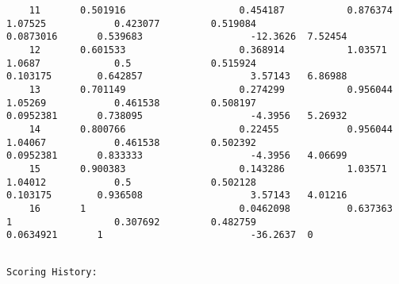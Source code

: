 \documentclass[11pt]{article}
\begin{document}
\begin{verbatim}
    11       0.501916                    0.454187           0.876374  1.07525            0.423077         0.519084                    0.0873016       0.539683                   -12.3626  7.52454
    12       0.601533                    0.368914           1.03571   1.0687             0.5              0.515924                    0.103175        0.642857                   3.57143   6.86988
    13       0.701149                    0.274299           0.956044  1.05269            0.461538         0.508197                    0.0952381       0.738095                   -4.3956   5.26932
    14       0.800766                    0.22455            0.956044  1.04067            0.461538         0.502392                    0.0952381       0.833333                   -4.3956   4.06699
    15       0.900383                    0.143286           1.03571   1.04012            0.5              0.502128                    0.103175        0.936508                   3.57143   4.01216
    16       1                           0.0462098          0.637363  1                  0.307692         0.482759                    0.0634921       1                          -36.2637  0
    \end{verbatim}

    
    \begin{Verbatim}[commandchars=\\\{\}]

Scoring History: 

    \end{Verbatim}
\end{document}
